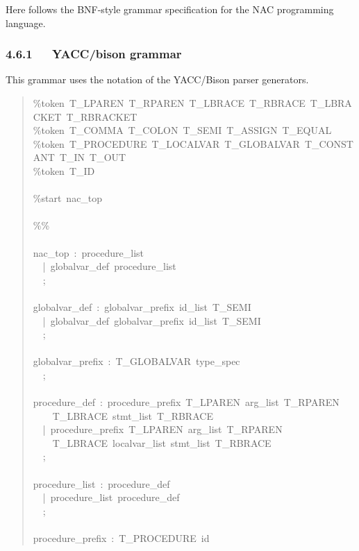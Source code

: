 \documentclass[a4paper]{article}
\begin{document}
Here follows the BNF-style grammar specification for the NAC programming
language.


\subsubsection{4.6.1~~~YACC/bison grammar%
  \label{yacc-bison-grammar}%
}

This grammar uses the notation of the YACC/Bison parser generators.
%
\begin{quote}{\ttfamily \raggedright \noindent
\%token~T\_LPAREN~T\_RPAREN~T\_LBRACE~T\_RBRACE~T\_LBRACKET~T\_RBRACKET\\
\%token~T\_COMMA~T\_COLON~T\_SEMI~T\_ASSIGN~T\_EQUAL\\
\%token~T\_PROCEDURE~T\_LOCALVAR~T\_GLOBALVAR~T\_CONSTANT~T\_IN~T\_OUT\\
\%token~T\_ID\\
~\\
\%start~nac\_top\\
~\\
\%\%\\
~\\
nac\_top~:~procedure\_list\\
~~|~globalvar\_def~procedure\_list\\
~~;\\
~\\
globalvar\_def~:~globalvar\_prefix~id\_list~T\_SEMI\\
~~|~globalvar\_def~globalvar\_prefix~id\_list~T\_SEMI\\
~~;\\
~\\
globalvar\_prefix~:~T\_GLOBALVAR~type\_spec\\
~~;\\
~\\
procedure\_def~:~procedure\_prefix~T\_LPAREN~arg\_list~T\_RPAREN\\
~~~~T\_LBRACE~stmt\_list~T\_RBRACE\\
~~|~procedure\_prefix~T\_LPAREN~arg\_list~T\_RPAREN\\
~~~~T\_LBRACE~localvar\_list~stmt\_list~T\_RBRACE\\
~~;\\
~\\
procedure\_list~:~procedure\_def\\
~~|~procedure\_list~procedure\_def\\
~~;\\
~\\
procedure\_prefix~:~T\_PROCEDURE~id\\
}
\end{quote}
\end{document}
